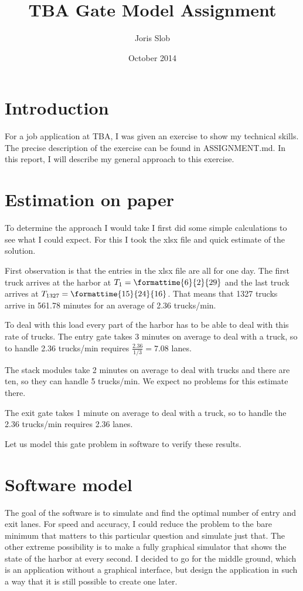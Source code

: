\documentclass{article}
\begin{document}
\title{TBA Gate Model Assignment}
\author{Joris Slob}
\date{October 2014}
\maketitle

\section{Introduction}

For a job application at TBA, I was given an exercise to show my
technical skills. The precise description of the exercise can be found
in ASSIGNMENT.md. In this report, I will describe my general approach
to this exercise.

\section{Estimation on paper}

To determine the approach I would take I first did some simple
calculations to see what I could expect. For this I took the xlsx file
and quick estimate of the solution.

First observation is that the entries in the xlsx file are all for one
day. The first truck arrives at the harbor at $T_1 =
\mbox{\formattime{6}{2}{29}}$ and the last truck arrives at $T_{1327}
= \mbox{\formattime{15}{24}{16}}$. That means that 1327 trucks arrive
in 561.78 minutes for an average of 2.36 trucks/min.

To deal with this load every part of the harbor has to be able to deal
with this rate of trucks. The entry gate takes 3 minutes on average to
deal with a truck, so to handle 2.36 trucks/min requires
$\frac{2.36}{1/3} = 7.08$ lanes.

The stack modules take 2 minutes on average to deal with trucks and
there are ten, so they can handle 5 trucks/min. We expect no problems
for this estimate there.

The exit gate takes 1 minute on average to deal with a truck, so to
handle the 2.36 trucks/min requires 2.36 lanes.

Let us model this gate problem in software to verify these results.

\section{Software model}

The goal of the software is to simulate and find the optimal number of
entry and exit lanes. For speed and accuracy, I could reduce the
problem to the bare minimum that matters to this particular question
and simulate just that. The other extreme possibility is to make a
fully graphical simulator that shows the state of the harbor at every
second. I decided to go for the middle ground, which is an application
without a graphical interface, but design the application in such a
way that it is still possible to create one later.
\end{document}
